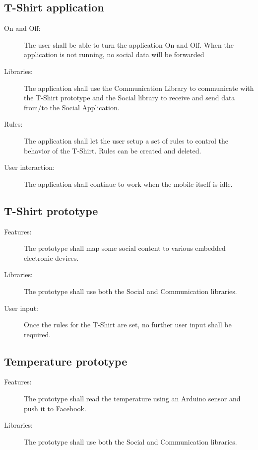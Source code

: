 	\subsection{T-Shirt application}
	
	\begin{description}
		\item[On and Off:] The user shall be able to turn the application On and Off.
		When the application is not running, no social data will be forwarded
		\item[Libraries:] The application shall use the Communication Library to
		communicate with the T-Shirt prototype and the Social library to
		receive and send data from/to the Social Application.
		\item[Rules:] The application shall let the user setup a set of rules
		to control the behavior of the T-Shirt. Rules can be created and deleted.
		\item[User interaction:] The application shall continue to work
		when the mobile itself is idle.
	\end{description}

	\newpage

	\subsection{T-Shirt prototype}

	\begin{description}
		\item[Features:] The prototype shall map some social content
		to various embedded electronic devices.
		\item[Libraries:] The prototype shall use both the Social and
		Communication libraries.
		\item[User input:] Once the rules for the T-Shirt are set,
		no further user input shall be required.
	\end{description}

	\subsection{Temperature prototype}
	\begin{description}
		\item[Features:] The prototype shall read the temperature
		using an Arduino sensor and push it to Facebook.
		\item[Libraries:] The prototype shall use both the Social and
		Communication libraries.
		\item[]
	\end{description}
	
